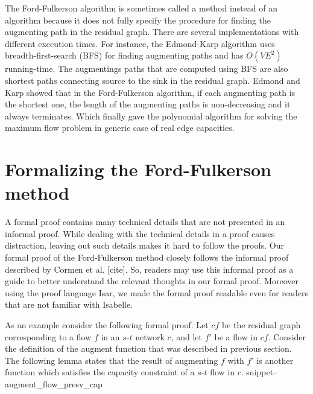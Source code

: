 \documentclass{llncs}
\newcommand{\Snippet}[1]{\csname snippet--#1\endcsname}
\begin{document}
The Ford-Fulkerson algorithm is sometimes called a method instead of an algorithm because it does not fully specify the procedure for finding the augmenting path in the residual graph. There are several implementations with different execution times. For instance, the Edmond-Karp algorithm uses breadth-first-search (BFS) for finding augmenting paths and has $O (VE^2)$ running-time. The augmentings paths that are computed using BFS are also shortest paths connecting source to the sink in the residual graph. Edmond and Karp showed that in the Ford-Fulkerson algorithm, if each augmenting path is the shortest one, the length of the augmenting paths is non-decreasing and it always terminates. Which finally gave the polynomial algorithm for solving the maximum flow problem in generic case of real edge capacities.


\section{Formalizing the Ford-Fulkerson method}
%
%    
%      
%    
%    

A formal proof contains many technical details that are not presented in an informal proof. While dealing with the technical details in a proof causes distraction, leaving out such details makes it hard to follow the proofs. Our formal proof of the Ford-Fulkerson method closely follows the informal proof described by Cormen et al. [cite]. So, readers may use this informal proof as a guide to better understand the relevant thoughts in our formal proof. Moreover using the proof language Isar, we made the formal proof readable even for readers that are not familiar with Isabelle.

As an example consider the following formal proof. Let $cf$ be the residual graph corresponding to a flow $f$ in an $s$-$t$ network $c$, and let $f'$ be a flow in $cf$. Consider the definition of the augment function that was described in previous section. The following lemma states that the result of augmenting $f$ with $f'$ is another function which satisfies the capacity constraint of a $s$-$t$ flow in $c$. 
\Snippet{augment_flow_presv_cap}
\end{document}
